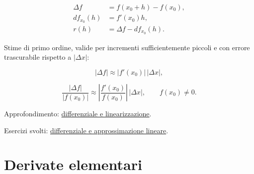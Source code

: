 \[
\begin{aligned}
\Delta f&=f(x_0+h)-f(x_0),\\
df_{x_0}(h)&=f'(x_0)h,\\
r(h)&=\Delta f-df_{x_0}(h).
\end{aligned}
\]

Stime di primo ordine, valide per incrementi sufficientemente piccoli e con errore trascurabile rispetto a \(|\Delta x|\):

\[
\displaystyle
|\Delta f|\approx |f'(x_0)|\,|\Delta x|,
\]

\[
\displaystyle
\frac{|\Delta f|}{|f(x_0)|}
\approx
\left|\frac{f'(x_0)}{f(x_0)}\right|\,|\Delta x|,
\qquad f(x_0)\ne0.
\]

Approfondimento: \href{https://ingegnerismo.it/matematica/differenziale/}{differenziale e linearizzazione}.

Esercizi svolti: \href{https://ingegnerismo.it/matematica/differenziale-approssimazione-lineare-esercizi/}{differenziale e approssimazione lineare}.

\section{Derivate elementari}\label{derivate-elementari}

